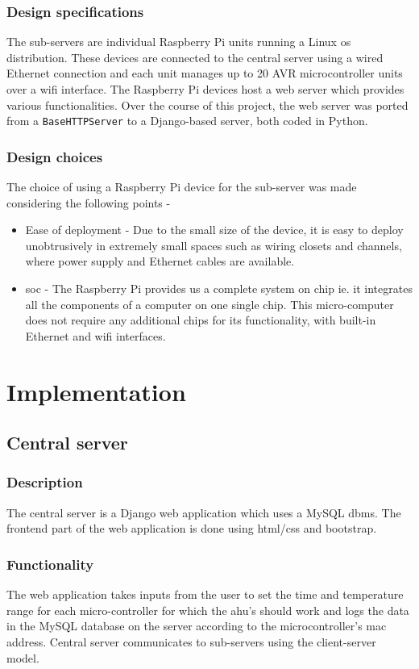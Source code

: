 \documentclass[letterpaper,11pt]{report}
\begin{document}
\subsection{Design specifications}
The sub-servers are individual Raspberry Pi units running a Linux \ac{os} distribution. These devices are connected to the central server using a wired Ethernet connection and each unit manages up to 20 AVR microcontroller units over a \ac{wifi} interface. The Raspberry Pi devices host a web server which provides various functionalities. Over the course of this project, the web server was ported from a \verb|BaseHTTPServer| to a Django-based server, both coded in Python.
\subsection{Design choices}
The choice of using a Raspberry Pi device for the sub-server was made considering the following points -
\begin{itemize}
    \item Ease of deployment - Due to the small size of the device, it is easy to deploy unobtrusively in extremely small spaces such as wiring closets and channels, where power supply and Ethernet cables are available.
    \item \ac{soc} - The Raspberry Pi provides us a complete system on chip ie. it integrates all the components of a computer on one single chip. This micro-computer does not require any additional chips for its functionality, with built-in Ethernet and \ac{wifi} interfaces.
\end{itemize}

\newpage
\chapter{Implementation}\label{chapter:Implementation}
\onehalfspacing
\section{Central server}
\subsection{Description}
The central server is a Django web application which uses a MySQL \ac{dbms}. The frontend part of the web application is done using \ac{html}/\ac{css} and bootstrap.
\subsection{Functionality}
The web application takes inputs from the user to set the time and temperature range for each micro-controller for which the \ac{ahu}'s should work and logs the data in the MySQL database on the server according to the microcontroller's \ac{mac} address. Central server communicates to sub-servers using the client-server model.
\end{document}
